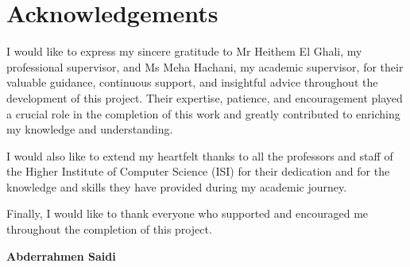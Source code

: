 \chapter*{Acknowledgements}
\thispagestyle{empty}

I would like to express my sincere gratitude to Mr Heithem El Ghali, my professional supervisor, and Ms Meha Hachani, my academic supervisor, for their valuable guidance, continuous support, and insightful advice throughout the development of this project. Their expertise, patience, and encouragement played a crucial role in the completion of this work and greatly contributed to enriching my knowledge and understanding.

I would also like to extend my heartfelt thanks to all the professors and staff of the Higher Institute of Computer Science (ISI) for their dedication and for the knowledge and skills they have provided during my academic journey.

Finally, I would like to thank everyone who supported and encouraged me throughout the completion of this project.

\vskip0.5cm
\begin{flushright}
\textbf{Abderrahmen Saidi}
\end{flushright}